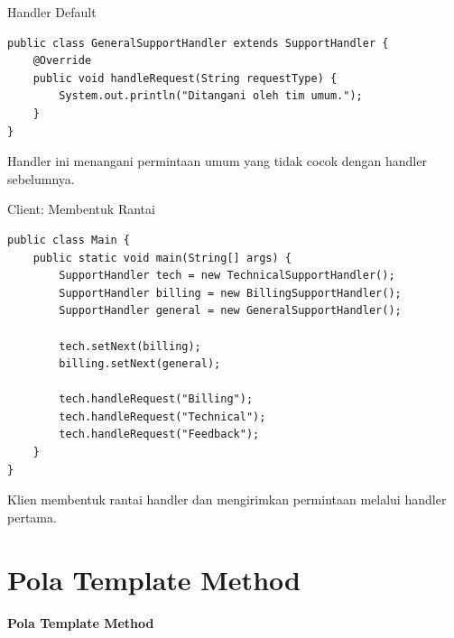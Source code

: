 \documentclass[aspectratio=169, table]{beamer}
\begin{document}
\begin{frame}[fragile]{Handler Default}
\begin{lstlisting}[style=JavaStyle]
public class GeneralSupportHandler extends SupportHandler {
	@Override
	public void handleRequest(String requestType) {
		System.out.println("Ditangani oleh tim umum.");
	}
}
\end{lstlisting}
\small Handler ini menangani permintaan umum yang tidak cocok dengan handler sebelumnya.
\end{frame}

\begin{frame}[fragile]{Client: Membentuk Rantai}
\begin{lstlisting}[style=JavaStyle]
public class Main {
	public static void main(String[] args) {
		SupportHandler tech = new TechnicalSupportHandler();
		SupportHandler billing = new BillingSupportHandler();
		SupportHandler general = new GeneralSupportHandler();
		
		tech.setNext(billing);
		billing.setNext(general);
		
		tech.handleRequest("Billing");
		tech.handleRequest("Technical");
		tech.handleRequest("Feedback");
	}
}
\end{lstlisting}
\small Klien membentuk rantai handler dan mengirimkan permintaan melalui handler pertama.
\end{frame}

\section{Pola Template Method}
\begin{frame}{\hfill}
\centering
\textbf{\Huge{Pola Template Method}}
\end{frame}
\end{document}
